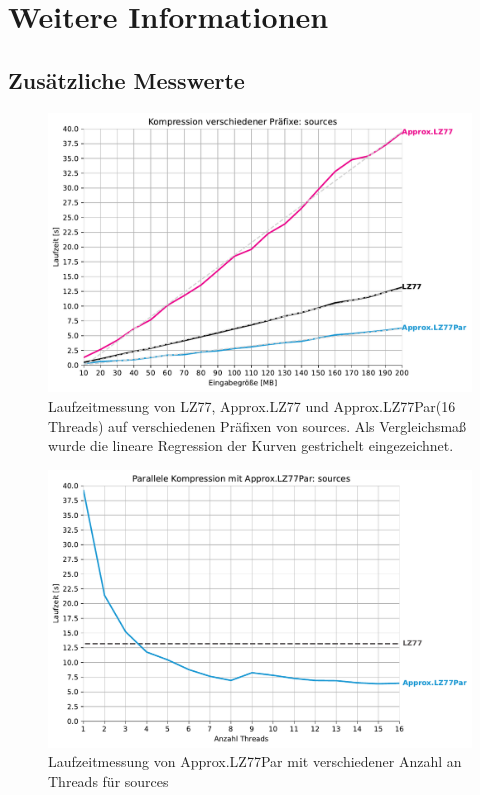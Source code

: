 \chapter{Weitere Informationen}
\section{Zusätzliche Messwerte}
\begin{figure}
    \centering
    \caption{Laufzeitmessung von LZ77, Approx.LZ77 und Approx.LZ77Par(16 Threads) auf verschiedenen Präfixen von sources. Als Vergleichsmaß wurde 
    die lineare Regression der Kurven gestrichelt eingezeichnet.}
    \includegraphics[scale=0.6]{Images/progressive_sources.pdf}
\end{figure}

\begin{figure}
    \centering
    \caption{Laufzeitmessung von Approx.LZ77Par mit verschiedener Anzahl an Threads für sources}
    \includegraphics[scale=0.6]{Images/progressive_speedup_sources.pdf}
\end{figure}

